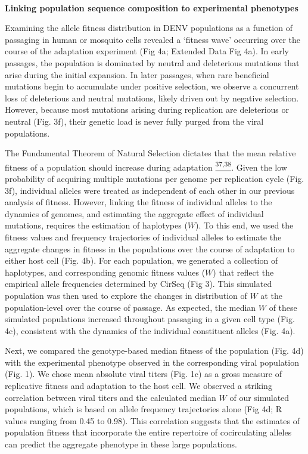 \documentclass[
]{article}
\begin{document}
~

\textbf{Linking population sequence composition to experimental
phenotypes}

Examining the allele fitness distribution in DENV populations as a
function of passaging in human or mosquito cells revealed a `fitness
wave' occurring over the course of the adaptation experiment (Fig 4a;
Extended Data Fig 4a). In early passages, the population is dominated by
neutral and deleterious mutations that arise during the initial
expansion. In later passages, when rare beneficial mutations begin to
accumulate under positive selection, we observe a concurrent loss of
deleterious and neutral mutations, likely driven out by negative
selection. However, because most mutations arising during replication
are deleterious or neutral (Fig. 3f), their genetic load is never fully
purged from the viral populations.

The Fundamental Theorem of Natural Selection dictates that the mean
relative fitness of a population should increase during adaptation
\href{https://paperpile.com/c/REZjPf/rysMZ+WYtJW}{\textsuperscript{37,38}}.
Given the low probability of acquiring multiple mutations per genome per
replication cycle (Fig. 3f), individual alleles were treated as
independent of each other in our previous analysis of fitness. However,
linking the fitness of individual alleles to the dynamics of genomes,
and estimating the aggregate effect of individual mutations, requires
the estimation of haplotypes (\(W\)). To this end, we used the fitness
values and frequency trajectories of individual alleles to estimate the
aggregate changes in fitness in the populations over the course of
adaptation to either host cell (Fig. 4b). For each population, we
generated a collection of haplotypes, and corresponding genomic fitness
values (\(W\)) that reflect the empirical allele frequencies determined
by CirSeq (Fig 3). This simulated population was then used to explore
the changes in distribution of \(W\) at the population-level over the
course of passage. As expected, the median \(W\) of these simulated
populations increased throughout passaging in a given cell type (Fig.
4c), consistent with the dynamics of the individual constituent alleles
(Fig. 4a).

Next, we compared the genotype-based median fitness of the population
(Fig. 4d) with the experimental phenotype observed in the corresponding
viral population (Fig. 1). We chose mean absolute viral titers (Fig. 1c)
as a gross measure of replicative fitness and adaptation to the host
cell. We observed a striking correlation between viral titers and the
calculated median \(W\) of our simulated populations, which is based on
allele frequency trajectories alone (Fig 4d; R values ranging from 0.45
to 0.98). This correlation suggests that the estimates of population
fitness that incorporate the entire repertoire of cocirculating alleles
can predict the aggregate phenotype in these large populations.
\end{document}
